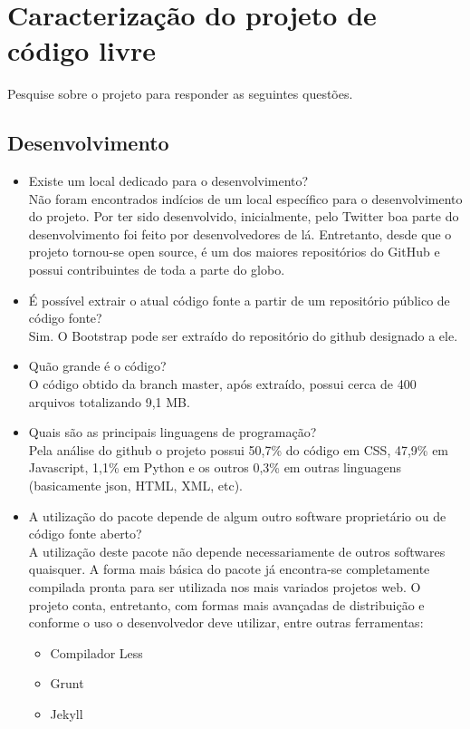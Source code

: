 \documentclass[12pt,a4paper]{article} %
\begin{document}
\section{Caracterização do projeto de código livre} 
Pesquise sobre o projeto para responder as seguintes questões.


\subsection{Desenvolvimento}


\begin{itemize}
\item Existe um local dedicado para o desenvolvimento?\\
	Não foram encontrados indícios de um local específico para o desenvolvimento do projeto. Por ter sido desenvolvido, inicialmente, pelo Twitter boa parte do desenvolvimento foi feito por desenvolvedores de lá. Entretanto, desde que o projeto tornou-se open source, é um dos maiores repositórios do GitHub e possui contribuintes de toda a parte do globo.
\item É possível extrair o atual código fonte a partir de um repositório público de código fonte?\\
	Sim. O Bootstrap pode ser extraído do repositório do github designado a ele.
\item Quão grande é o código?\\
	O código obtido da branch master, após extraído, possui cerca de 400 arquivos totalizando 9,1 MB.
\item Quais são as principais linguagens de programação?\\
	Pela análise do github o projeto possui 50,7\% do código em CSS, 47,9\% em Javascript, 1,1\% em Python e os outros 0,3\% em outras linguagens (basicamente json, HTML, XML, etc).
\item A utilização do pacote depende de algum outro software proprietário ou de código fonte aberto?\\
	A utilização deste pacote não depende necessariamente de outros softwares quaisquer. A forma mais básica do pacote já encontra-se completamente compilada pronta para ser utilizada nos mais variados projetos web. O projeto conta, entretanto, com formas mais avançadas de distribuição e conforme o uso o desenvolvedor deve utilizar, entre outras ferramentas:
	\begin{itemize}
	\item Compilador Less
	\item Grunt
	\item Jekyll

\end{itemize}
\end{itemize}
\end{document}

